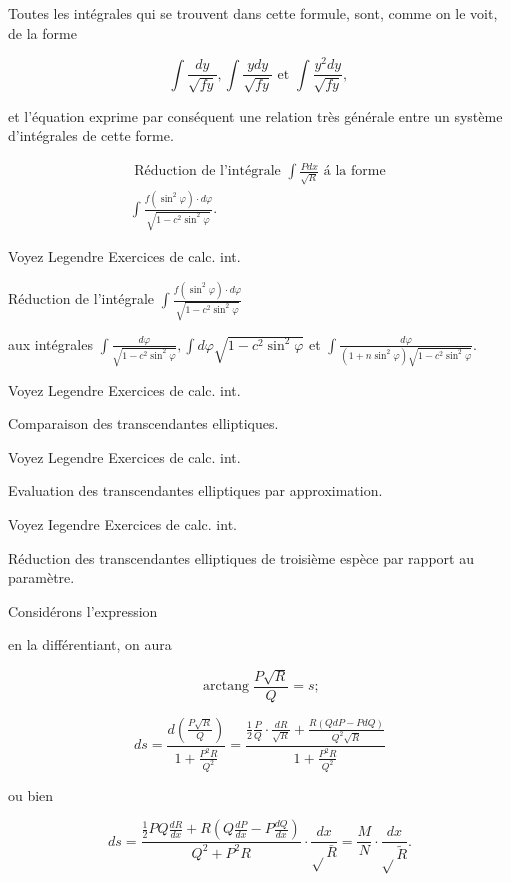 \documentclass{article}
\begin{document}
Toutes les intégrales qui se trouvent dans cette formule, sont, comme on le voit, de la forme

\[
\int \frac{d y}{\sqrt{f y}}, \int \frac{y d y}{\sqrt{f y}} \text { et } \int \frac{y^{2} d y}{\sqrt{f y}} \text {, }
\]

et l'équation exprime par conséquent une relation très générale entre un système d'intégrales de cette forme.

\[
\begin{gathered}
\text { Réduction de l'intégrale } \int \frac{P d x}{\sqrt{R}} \text { á la forme } \\
\int \frac{f\left(\sin ^{2} \varphi\right) \cdot d \varphi}{\sqrt{1-c^{2} \sin ^{2} \varphi}} .
\end{gathered}
\]

Voyez Legendre Exercices de calc. int.

Réduction de l'intégrale \(\int \frac{f\left(\sin ^{2} \varphi\right) \cdot d \varphi}{\sqrt{1-c^{2} \sin ^{2} \varphi}}\)

aux intégrales \(\int \frac{d \varphi}{\sqrt{1-c^{2} \sin ^{2} \varphi}}, \int d \varphi \sqrt{1-c^{2} \sin ^{2} \varphi}\) et \(\int \frac{d \varphi}{\left(1+n \sin ^{2} \varphi\right) \sqrt{1-c^{2} \sin ^{2} \varphi}}\).

Voyez Legendre Exercices de calc. int.

Comparaison des transcendantes elliptiques.

Voyez Legendre Exercices de calc. int.

Evaluation des transcendantes elliptiques par approximation.

Voyez Iegendre Exercices de calc. int.

Réduction des transcendantes elliptiques de troisième espèce par rapport au paramètre.

Considérons l'expression

en la différentiant, on aura

\[
\operatorname{arctang} \frac{P \sqrt{R}}{Q}=s ;
\]

\[
d s=\frac{d\left(\frac{P \sqrt{R}}{Q}\right)}{1+\frac{P^{2} R}{Q^{2}}}=\frac{\frac{1}{2} \frac{P}{Q} \cdot \frac{d R}{\sqrt{R}}+\frac{R(Q d P-P d Q)}{Q^{2} \sqrt{R}}}{1+\frac{P^{2} R}{Q^{2}}}
\]

ou bien

\[
d s=\frac{\frac{1}{2} P Q \frac{d R}{d x}+R\left(Q \frac{d P}{d x}-P \frac{d Q}{d x}\right)}{Q^{2}+P^{2} R} \cdot \frac{d x}{\sqrt{ } \bar{R}}=\frac{M}{N} \cdot \frac{d x}{\sqrt{ } \tilde{R}} .
\]
\end{document}
